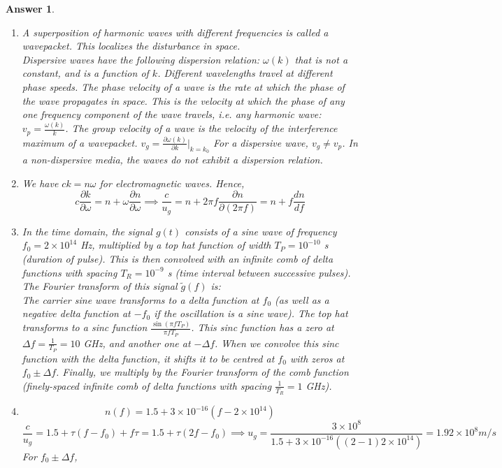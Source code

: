 \documentclass[a4paper]{article}
\newtheorem{ans}{Answer}[subsection]
\theoremstyle{new}
\begin{document}
\begin{ans}\leavevmode
\begin{enumerate}[label=(\roman*)]
\item A superposition of harmonic waves with different frequencies is called a wavepacket. This localizes the disturbance in space.\\[5pt]
Dispersive waves have the following dispersion relation: $\omega(k)$ that is not a constant, and is a function of $k$. Different wavelengths travel at different phase speeds. The phase velocity of a wave is the rate at which the phase of the wave propagates in space. This is the velocity at which the phase of any one frequency component of the wave travels, i.e. any harmonic wave: $v_p=\frac{\omega(k)}{k}$. The group velocity of a wave is the velocity of the interference maximum of a wavepacket. $v_g=\frac{\partial\omega(k)}{\partial k}|_{k=k_0}$ For a dispersive wave, $v_g\neq v_p$. In a non-dispersive media, the waves do not exhibit a dispersion relation.
\item We have $ck=n\omega$ for electromagnetic waves. Hence, 
$$c\frac{\partial k}{\partial\omega}=n+\omega\frac{\partial n}{\partial\omega}\implies\frac{c}{u_g}=n+2\pi f\frac{\partial n}{\partial(2\pi f)}=n+f\frac{dn}{df}$$
\item In the time domain, the signal $g(t)$ consists of a sine wave of frequency $f_0=2\times10^{14}$ Hz, multiplied by a top hat function of width $T_P=10^{-10}$ s (duration of pulse). This is then convolved with an infinite comb of delta functions with spacing $T_R=10^{-9}$ s (time interval between successive pulses). The Fourier transform of this signal $\tilde{g}(f)$ is:\\[5pt]
The carrier sine wave transforms to a delta function at $f_0$ (as well as a negative delta function at $-f_0$ if the oscillation is a sine wave). The top hat transforms to a sinc function $\frac{\sin(\pi fT_P)}{\pi fT_P}$. This sinc function has a zero at $\Delta f=\frac{1}{T_P}=10$ GHz, and another one at $-\Delta f$. When we convolve this sinc function with the delta function, it shifts it to be centred at $f_0$ with zeros at $f_0\pm \Delta f$. Finally, we multiply by the Fourier transform of the comb function (finely-spaced infinite comb of delta functions with spacing $\frac{1}{T_R}=1$ GHz).
\item 
$$n(f)=1.5+3\times10^{-16}(f-2\times10^{14})$$
$$\frac{c}{u_g}=1.5+\tau(f-f_0)+f\tau=1.5+\tau(2f-f_0)\implies u_g=\frac{3\times10^8}{1.5+3\times10^{-16}((2-1)2\times10^{14})}=1.92\times10^8 m/s$$
For $f_0\pm\Delta f$,

\end{enumerate}
\end{ans}
\end{document}
